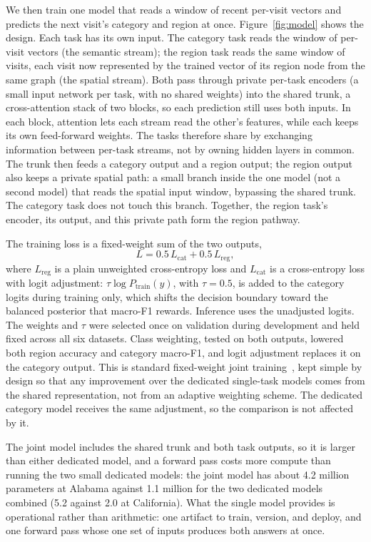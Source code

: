 We then train one model that reads a window of recent per-visit vectors and predicts the next visit's category and region at once. Figure~\ref{fig:model} shows the design. Each task has its own input. The category task reads the window of per-visit vectors (the semantic stream); the region task reads the same window of visits, each visit now represented by the trained vector of its region node from the same graph (the spatial stream). Both pass through private
per-task encoders (a small input network per task, with no shared weights) into the shared trunk, a cross-attention stack of two blocks, so each prediction still uses both inputs. In each block, attention lets each
stream read the other's features, while each keeps its own feed-forward
weights. The tasks therefore share by exchanging information between per-task
streams, not by owning hidden layers in common. The trunk then feeds a category output and a region output; the region output also keeps a private spatial path: a small branch inside the one model (not a second model) that reads the spatial input window, bypassing the shared trunk. The category task does not touch this branch. Together, the region task's encoder, its output, and this private path form the region pathway.

The training loss is a fixed-weight sum of the two outputs,
\begin{equation}\label{eq:loss}
L = 0.5\,L_{\mathrm{cat}} + 0.5\,L_{\mathrm{reg}},
\end{equation}
where $L_{\mathrm{reg}}$ is a plain unweighted cross-entropy loss and $L_{\mathrm{cat}}$ is a
cross-entropy loss with logit adjustment: $\tau\log P_{\mathrm{train}}(y)$, with $\tau=0.5$, is added
to the category logits during training only, which shifts the decision boundary toward the balanced
posterior that macro-F1 rewards. Inference uses the unadjusted logits. The weights and $\tau$ were
selected once on validation during development and held fixed across all six datasets. Class
weighting, tested on both outputs, lowered both region accuracy and category macro-F1, and logit
adjustment replaces it on the category output. This is standard fixed-weight joint
training~\cite{caruana1997multitask}, kept simple by design so that any improvement over the
dedicated single-task models comes from the shared representation, not from an adaptive weighting
scheme. The dedicated category model receives the same adjustment, so the comparison is not affected
by it.

The joint model includes the shared trunk and both task outputs, so it is
larger than either dedicated model, and a forward pass costs more compute than running the
two small dedicated models: the joint model has about 4.2 million parameters at
Alabama against 1.1 million for the two dedicated models combined (5.2 against
2.0 at California). What the single model provides is operational rather
than arithmetic: one artifact to train, version, and deploy, and one forward
pass whose one set of inputs produces both answers at once.
